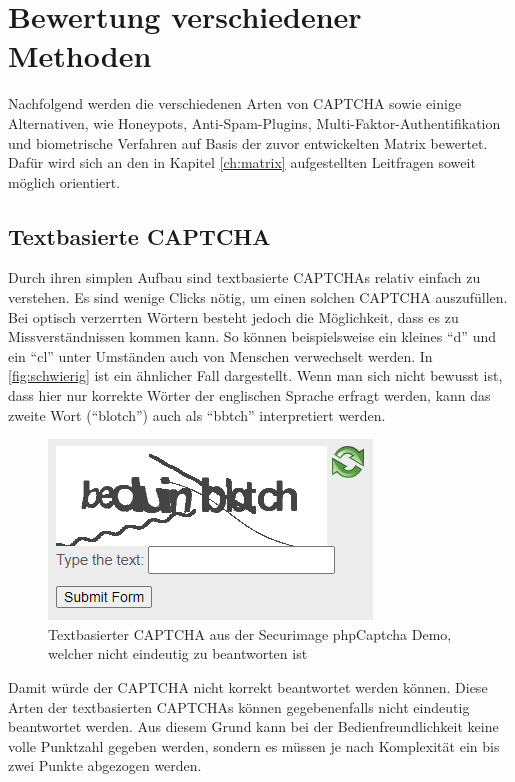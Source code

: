 \chapter{Bewertung verschiedener Methoden}

Nachfolgend werden die verschiedenen Arten von CAPTCHA sowie einige Alternativen, wie Honeypots, Anti-Spam-Plugins, 
Multi-Faktor-Authentifikation und biometrische Verfahren auf Basis der zuvor entwickelten Matrix bewertet. 
Dafür wird sich an den in Kapitel \ref{ch:matrix} aufgestellten Leitfragen soweit möglich orientiert.

\section{Textbasierte CAPTCHA}
Durch ihren simplen Aufbau sind textbasierte CAPTCHAs relativ einfach zu verstehen.
Es sind wenige Clicks nötig, um einen solchen CAPTCHA auszufüllen. 
Bei optisch verzerrten Wörtern besteht jedoch die Möglichkeit, dass es zu Missverständnissen kommen kann.
So können beispielsweise ein kleines ``d'' und ein ``cl'' unter Umständen auch von Menschen verwechselt werden. 
In \autoref{fig:schwierig} ist ein ähnlicher Fall dargestellt. 
Wenn man sich nicht bewusst ist, dass hier nur korrekte Wörter der englischen Sprache erfragt werden,
kann das zweite Wort (``blotch'') auch als ``bbtch'' interpretiert werden.

\begin{figure}[h!]
    \centering
    \includegraphics{gfx/mygraphics/schwierig4.png}
    \caption{Textbasierter CAPTCHA aus der Securimage phpCaptcha Demo, welcher nicht eindeutig zu beantworten ist}
    \label{fig:schwierig}
\end{figure}

Damit würde der CAPTCHA nicht korrekt beantwortet werden können.
Diese Arten der textbasierten CAPTCHAs können gegebenenfalls nicht eindeutig beantwortet werden.
Aus diesem Grund kann bei der Bedienfreundlichkeit keine volle Punktzahl gegeben werden,
sondern es müssen je nach Komplexität ein bis zwei Punkte abgezogen werden.

